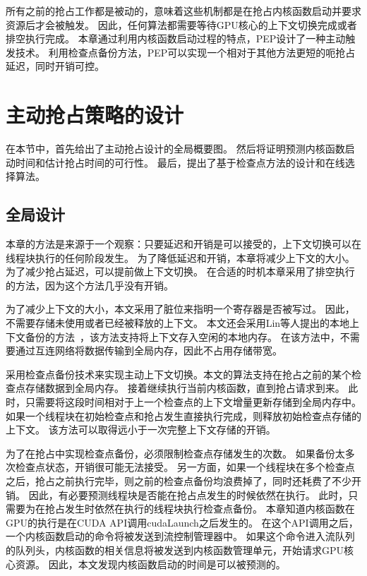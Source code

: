 所有之前的抢占工作都是被动的，意味着这些机制都是在抢占内核函数启动并要求资源后才会被触发。
因此，任何算法都需要等待GPU核心的上下文切换完成或者排空执行完成。
本章通过利用内核函数启动过程的特点，PEP设计了一种主动触发技术。
利用检查点备份方法，PEP可以实现一个相对于其他方法更短的呃抢占延迟，同时开销可控。

\section{主动抢占策略的设计}
\label{sec:pepdesign}

在本节中，首先给出了主动抢占设计的全局概要图。
然后将证明预测内核函数启动时间和估计抢占时间的可行性。
最后，提出了基于检查点方法的设计和在线选择算法。

\subsection{全局设计}
本章的方法是来源于一个观察：只要延迟和开销是可以接受的，上下文切换可以在线程块执行的任何阶段发生。
为了降低延迟和开销，本章将减少上下文的大小。
为了减少抢占延迟，可以提前做上下文切换。
在合适的时机本章采用了排空执行的方法，因为这个方法几乎没有开销。

为了减少上下文的大小，本文采用了脏位来指明一个寄存器是否被写过。
因此，不需要存储未使用或者已经被释放的上下文。
本文还会采用Lin等人提出的本地上下文备份的方法~，该方法支持将上下文存入空闲的本地内存。
在该方法中，不需要通过互连网络将数据传输到全局内存，因此不占用存储带宽。

采用检查点备份技术来实现主动上下文切换。本文的算法支持在抢占之前的某个检查点存储数据到全局内存。
接着继续执行当前内核函数，直到抢占请求到来。
此时，只需要将这段时间相对于上一个检查点的上下文增量更新存储到全局内存中。
如果一个线程块在初始检查点和抢占发生直接执行完成，则释放初始检查点存储的上下文。
该方法可以取得远小于一次完整上下文存储的开销。

为了在抢占中实现检查点备份，必须限制检查点存储发生的次数。
如果备份太多次检查点状态，开销很可能无法接受。
另一方面，如果一个线程块在多个检查点之后，抢占之前执行完毕，则之前的检查点备份均浪费掉了，同时还耗费了不少开销。
因此，有必要预测线程块是否能在抢占点发生的时候依然在执行。
此时，只需要为在抢占发生时依然在执行的线程块执行检查点备份。
本章知道内核函数在GPU的执行是在CUDA API调用cudaLaunch之后发生的。
在这个API调用之后，一个内核函数启动的命令将被发送到流控制管理器中。
如果这个命令进入流队列的队列头，内核函数的相关信息将被发送到内核函数管理单元，开始请求GPU核心资源。
因此，本文发现内核函数启动的时间是可以被预测的。

